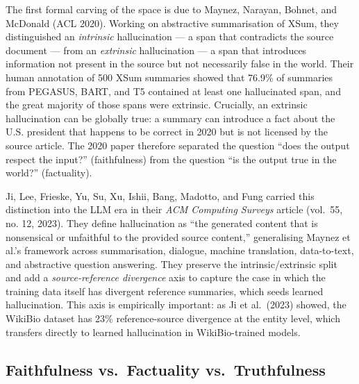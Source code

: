 \documentclass{article}
\begin{document}
The first formal carving of the space is due to Maynez, Narayan, Bohnet, and McDonald (ACL 2020). Working on abstractive summarisation of XSum, they distinguished an \emph{intrinsic} hallucination --- a span that contradicts the source document --- from an \emph{extrinsic} hallucination --- a span that introduces information not present in the source but not necessarily false in the world. Their human annotation of 500 XSum summaries showed that 76.9\% of summaries from PEGASUS, BART, and T5 contained at least one hallucinated span, and the great majority of those spans were extrinsic. Crucially, an extrinsic hallucination can be globally true: a summary can introduce a fact about the U.S. president that happens to be correct in 2020 but is not licensed by the source article. The 2020 paper therefore separated the question ``does the output respect the input?'' (faithfulness) from the question ``is the output true in the world?'' (factuality).

Ji, Lee, Frieske, Yu, Su, Xu, Ishii, Bang, Madotto, and Fung carried this distinction into the LLM era in their \emph{ACM Computing Surveys} article (vol.~55, no. 12, 2023). They define hallucination as ``the generated content that is nonsensical or unfaithful to the provided source content,'' generalising Maynez et al.'s framework across summarisation, dialogue, machine translation, data-to-text, and abstractive question answering. They preserve the intrinsic/extrinsic split and add a \emph{source-reference divergence} axis to capture the case in which the training data itself has divergent reference summaries, which seeds learned hallucination. This axis is empirically important: as Ji et al.~(2023) showed, the WikiBio dataset has 23\% reference-source divergence at the entity level, which transfers directly to learned hallucination in WikiBio-trained models.

\subsection{Faithfulness vs.~Factuality vs.~Truthfulness}\label{faithfulness-vs.-factuality-vs.-truthfulness}
\end{document}
